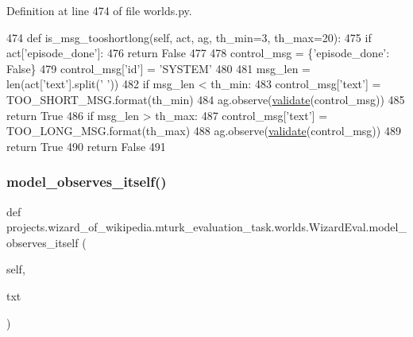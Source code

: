 Definition at line 474 of file worlds.\+py.


\begin{DoxyCode}
474     \textcolor{keyword}{def }is\_msg\_tooshortlong(self, act, ag, th\_min=3, th\_max=20):
475         \textcolor{keywordflow}{if} act[\textcolor{stringliteral}{'episode\_done'}]:
476             \textcolor{keywordflow}{return} \textcolor{keyword}{False}
477 
478         control\_msg = \{\textcolor{stringliteral}{'episode\_done'}: \textcolor{keyword}{False}\}
479         control\_msg[\textcolor{stringliteral}{'id'}] = \textcolor{stringliteral}{'SYSTEM'}
480 
481         msg\_len = len(act[\textcolor{stringliteral}{'text'}].split(\textcolor{stringliteral}{' '}))
482         \textcolor{keywordflow}{if} msg\_len < th\_min:
483             control\_msg[\textcolor{stringliteral}{'text'}] = TOO\_SHORT\_MSG.format(th\_min)
484             ag.observe(\hyperlink{namespaceparlai_1_1core_1_1worlds_afc3fad603b7bce41dbdc9cdc04a9c794}{validate}(control\_msg))
485             \textcolor{keywordflow}{return} \textcolor{keyword}{True}
486         \textcolor{keywordflow}{if} msg\_len > th\_max:
487             control\_msg[\textcolor{stringliteral}{'text'}] = TOO\_LONG\_MSG.format(th\_max)
488             ag.observe(\hyperlink{namespaceparlai_1_1core_1_1worlds_afc3fad603b7bce41dbdc9cdc04a9c794}{validate}(control\_msg))
489             \textcolor{keywordflow}{return} \textcolor{keyword}{True}
490         \textcolor{keywordflow}{return} \textcolor{keyword}{False}
491 
\end{DoxyCode}
\mbox{\label{classprojects_1_1wizard__of__wikipedia_1_1mturk__evaluation__task_1_1worlds_1_1WizardEval_a57f678d93fee85fb988fce00c22560d5}} 
\subsubsection{\texorpdfstring{model\+\_\+observes\+\_\+itself()}{model\_observes\_itself()}}
{\footnotesize\ttfamily def projects.\+wizard\+\_\+of\+\_\+wikipedia.\+mturk\+\_\+evaluation\+\_\+task.\+worlds.\+Wizard\+Eval.\+model\+\_\+observes\+\_\+itself (\begin{DoxyParamCaption}\item[{}]{self,  }\item[{}]{txt }\end{DoxyParamCaption})}




